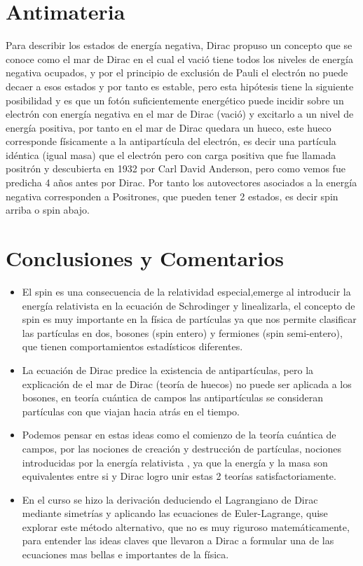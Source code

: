 \documentclass[twocolumn]{article}
\begin{document}
\section{Antimateria}
Para describir los estados de energía negativa, Dirac propuso un concepto que se conoce como el mar de Dirac en el cual el vació tiene todos los niveles de energía  negativa ocupados, y por el principio de exclusión de Pauli el electrón no puede decaer a esos estados y por tanto es estable, pero esta hipótesis tiene la siguiente posibilidad y es que un fotón suficientemente energético puede incidir sobre un electrón con energía negativa en el mar de Dirac (vació) y excitarlo a un nivel de energía positiva, por tanto en el mar de Dirac quedara un hueco, este hueco corresponde físicamente a la antipartícula del electrón, es decir una partícula idéntica (igual masa) que el electrón pero con carga positiva que fue llamada positrón y descubierta en 1932 por Carl David Anderson, pero como vemos fue predicha 4 años antes por Dirac.
Por tanto los autovectores asociados a la energía negativa corresponden a Positrones, que pueden tener 2 estados, es decir spin arriba o spin abajo.

\section{Conclusiones y Comentarios}
\begin{itemize}
    \item El spin es una consecuencia de la relatividad especial,emerge al introducir la energía relativista en la ecuación de Schrodinger y linealizarla, el concepto de spin es muy importante en la física de partículas ya que nos permite clasificar las partículas en dos, bosones (spin entero) y fermiones (spin semi-entero), que tienen comportamientos estadísticos diferentes.
    \item La ecuación de Dirac predice la existencia de antipartículas, pero la explicación de el mar de Dirac (teoría de huecos) no puede ser aplicada a los bosones, en teoría cuántica de campos las antipartículas se consideran partículas con que viajan hacia atrás en el tiempo.
    \item Podemos pensar en estas ideas como el comienzo de la teoría cuántica de campos, por las nociones de creación y destrucción de partículas, nociones introducidas por la energía relativista , ya que la energía y la masa son equivalentes entre si y Dirac logro unir estas 2 teorías satisfactoriamente.
    \item En el curso se hizo la derivación deduciendo el Lagrangiano de Dirac mediante simetrías y aplicando las ecuaciones de Euler-Lagrange, quise explorar este método alternativo, que no es muy riguroso matemáticamente, para entender las ideas claves  que llevaron a Dirac a formular una de las ecuaciones mas bellas e importantes de la física.
\end{itemize}
\end{document}
